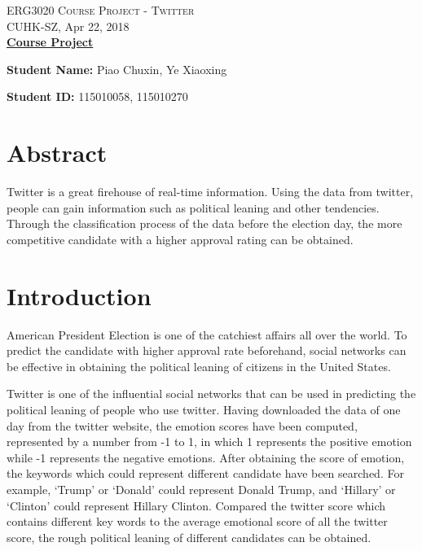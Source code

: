 \documentclass[12pt,a4paper]{article}
\begin{document}
\begin{center}
  \textsc{ERG3020 Course Project - Twitter} \\
  CUHK-SZ, Apr 22, 2018
  \\[\baselineskip]

  \textbf{\underline{Course Project}}
\end{center}

\noindent\textbf{Student Name:}  Piao Chuxin, Ye Xiaoxing

\noindent\textbf{Student ID:}  115010058, 115010270

\noindent\hrulefill

\tableofcontents

\newpage

\section{Abstract}

  Twitter is a great firehouse of real-time information. Using the data from twitter, people can gain information such as political leaning and other tendencies. Through the classification process of the data before the election day, the more competitive candidate with a higher approval rating can be obtained.

\section{Introduction}

  American President Election is one of the catchiest affairs all over the world. To predict the candidate with higher approval rate beforehand, social networks can be effective in obtaining the political leaning of citizens in the United States.

  Twitter is one of the influential social networks that can be used in predicting the political leaning of people who use twitter. Having downloaded the data of one day from the twitter website, the emotion scores have been computed, represented by a number from -1 to 1, in which 1 represents the positive emotion while -1 represents the negative emotions. After obtaining the score of emotion, the keywords which could represent different candidate have been searched. For example, ‘Trump’ or ‘Donald’ could represent Donald Trump, and ‘Hillary’ or ‘Clinton’ could represent Hillary Clinton. Compared the twitter score which contains different key words to the average emotional score of all the twitter score, the rough political leaning of different candidates can be obtained.
\end{document}
